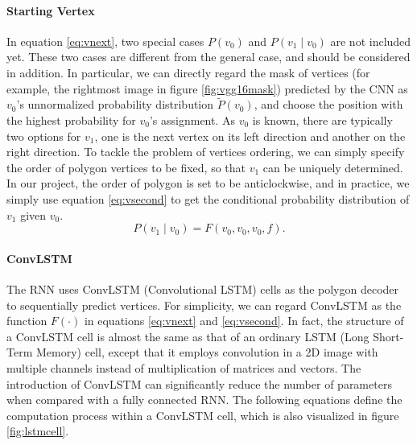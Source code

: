 \paragraph{Starting Vertex} In equation \ref{eq:vnext}, two special cases $P(v_0)$ and $P(v_1 \mid v_0)$ are not included yet. These two cases are different from the general case, and should be considered in addition. In particular, we can directly regard the mask of vertices (for example, the rightmost image in figure \ref{fig:vgg16mask}) predicted by the CNN as $v_0$'s unnormalized probability distribution $\tilde{P}(v_0)$, and choose the position with the highest probability for $v_0$'s assignment. As $v_0$ is known, there are typically two options for $v_1$, one is the next vertex on its left direction and another on the right direction. To tackle the problem of vertices ordering, we can simply specify the order of polygon vertices to be fixed, so that $v_1$ can be uniquely determined. In our project, the order of polygon is set to be anticlockwise, and in practice, we simply use equation \ref{eq:vsecond} to get the conditional probability distribution of $v_1$ given $v_0$.
\begin{equation}\label{eq:vsecond}
	P(v_1 \mid v_0) = F(v_0, v_0, v_0, f).
\end{equation}

\paragraph{ConvLSTM} The RNN uses ConvLSTM (Convolutional LSTM) \cite{convlstm} cells as the polygon decoder to sequentially predict vertices. For simplicity, we can regard ConvLSTM as the function $F(\cdot)$ in equations \ref{eq:vnext} and \ref{eq:vsecond}. In fact, the structure of a ConvLSTM cell is almost the same as that of an ordinary LSTM (Long Short-Term Memory) \cite{lstm} cell, except that it employs convolution in a 2D image with multiple channels instead of multiplication of matrices and vectors. The introduction of ConvLSTM can significantly reduce the number of parameters when compared with a fully connected RNN. The following equations define the computation process within a ConvLSTM cell, which is also visualized in figure \ref{fig:lstmcell}.



